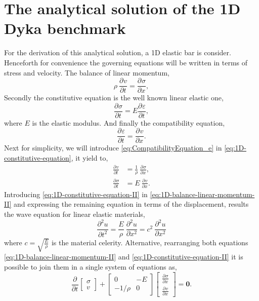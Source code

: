 \documentclass[preprint,12pt,a4paper]{elsarticle}
\newcommand{\Vector}[1]{
  \ensuremath{\mathbf{{#1}}}
}
\newcommand{\Deriv}[3][]{
  \ensuremath{\frac{\partial^{#1}{#2}}{ \partial {#3}^{#1} }}
}
\begin{document}
\printglossaries

\appendix

\section{The analytical solution of the 1D Dyka benchmark}
\label{app:analytical_sol}

For the derivation of this analytical solution, a 1D elastic bar is
consider. Henceforth for convenience the governing equations will be written in terms of stress and velocity. The balance of linear momentum,
\begin{equation}
  \label{eq:1D-balance-linear-momentum}
  \rho\ \Deriv{v}{t} = \Deriv{\sigma}{x},
\end{equation}
Secondly the constitutive equation is the well known linear
elastic one,
\begin{equation}
  \label{eq:1D-constitutive-equation}
  \Deriv{\sigma}{t} = E \Deriv{\varepsilon}{t},
\end{equation}
where $E$ is the elastic modulus. And finally the compatibility
equation,
\begin{equation}
  \label{eq:CompatibilityEquation_e}
  \Deriv{\varepsilon}{t} = \Deriv{v}{x}.
\end{equation}
Next for simplicity, we will introduce
\eqref{eq:CompatibilityEquation_e} in
\eqref{eq:1D-constitutive-equation}, it yield to,
\begin{align}
  \label{eq:1D-balance-linear-momentum-II}
  \Deriv{v}{t} &= \frac{1}{\rho}\ \Deriv{\sigma}{x}, \\
  \label{eq:1D-constitutive-equation-II}
  \Deriv{\sigma}{t} &= E\ \Deriv{v}{x}.
\end{align}
Introducing \eqref{eq:1D-constitutive-equation-II} in
\eqref{eq:1D-balance-linear-momentum-II} and expressing the remaining equation in terms of the displacement, results the wave equation for linear elastic materials,
\begin{equation}
  \label{eq:1D-wave-elastic}
  \Deriv[2]{u}{t} = \frac{E}{\rho}\ \Deriv[2]{u}{x} = c^2\ \Deriv[2]{u}{x}
\end{equation}
where $c = \sqrt{\frac{E}{\rho}}$ is the material celerity. Alternative, rearranging both equations \eqref{eq:1D-balance-linear-momentum-II} and
\eqref{eq:1D-constitutive-equation-II} it is possible to join them in a single system of equations as,
\begin{equation}
  \label{eq:System-stress-velocity}
  \Deriv{}{t} \left[
    \begin{array}{c}
      \sigma \\
      v
    \end{array}
  \right] + \left[
    \begin{array}{cc}
      0 & - E \\
      - 1/\rho & 0 
    \end{array} \right] \left[
    \begin{array}{c}
      \Deriv{\sigma}{x} \\
      \Deriv{v}{x}
    \end{array}
  \right] = \Vector{0}.
\end{equation}
\end{document}
